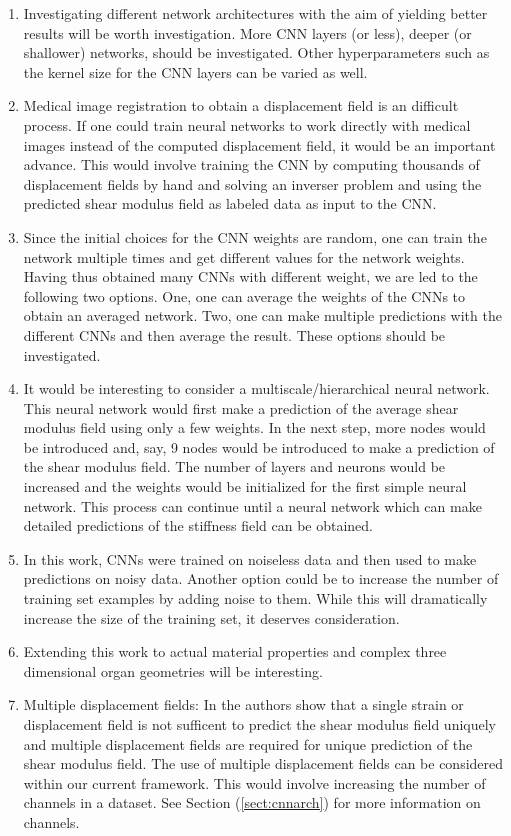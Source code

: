 \documentclass[12pt]{article}
\begin{document}
\begin{enumerate}
\item{Investigating different network architectures with the aim of yielding better results will be worth investigation. More CNN layers (or less), deeper (or shallower) networks, should be investigated. Other hyperparameters such as the kernel size for the CNN layers can be varied as well.}
\item{Medical image registration to obtain a displacement field is an difficult process. If one could train neural networks to work directly with medical images instead of the computed displacement field, it would be an important advance. This would involve training the CNN by computing thousands of displacement fields by hand and solving an inverser problem and using the predicted shear modulus field as labeled data as input to the CNN.}
\item{Since the initial choices for the CNN weights are random, one can train the network multiple times and get different values for the network weights. Having thus obtained many CNNs with different weight, we are led to the following two options. One, one can average the weights of the CNNs to obtain an averaged network. Two, one can make multiple predictions with the different CNNs and then average the result. These options should be investigated.}
\item{It would be interesting to consider a multiscale/hierarchical neural network. This neural network would first make a prediction of the average shear modulus field using only a few weights. In the next step, more nodes would be introduced and, say, 9 nodes would be introduced to make a prediction of the shear modulus field. The number of layers and neurons would be increased and the weights would be initialized for the first simple neural network. This process can continue until a neural network which can make detailed predictions of the stiffness field can be obtained. }
\item{In this work, CNNs were trained on noiseless data and then used to make predictions on noisy data. Another option could be to increase the number of training set examples by adding noise to them. While this will dramatically increase the size of the training set, it deserves consideration.}
\item{Extending this work to actual material properties and complex three dimensional organ geometries will be interesting. }
\item{Multiple displacement fields: In \cite{paper:barbonegokhale,paper:barbonebamber} the authors show that a single strain or displacement field is not sufficent to predict the shear modulus field uniquely and multiple displacement fields are required for unique prediction of the shear modulus field. The use of multiple displacement fields can be considered within our current framework. This would involve increasing the number of channels in a dataset. See Section (\ref{sect:cnnarch}) for more information on channels.} 

\end{enumerate}
\end{document}
